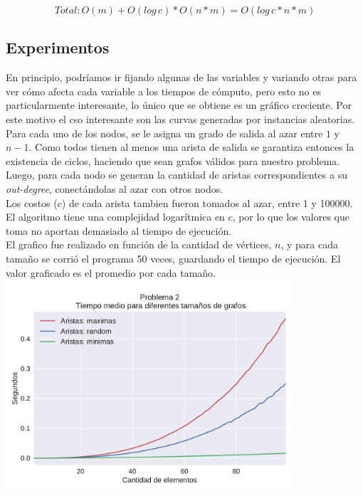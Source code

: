 $$Total:  O(m) + O(log \, c) * O(n*m) = O(log \, c *n*m) $$

\subsection{Experimentos}

En principio, podríamos ir fijando algunas de las variables y variando otras para ver cómo afecta cada variable a los tiempos de cómputo, pero esto no es particularmente interesante, lo único que se obtiene es un gráfico creciente. Por este motivo el cso interesante son las curvas generadas por instancias aleatorias.\\

Para cada uno de los nodos, se le asigna un grado de salida al azar entre $1$ y $n-1$. Como todos tienen al menos una arista de salida se garantiza entonces la existencia de ciclos, haciendo que sean grafos válidos para nuestro problema. Luego, para cada nodo se generan la cantidad de aristas correspondientes a su \textit{out-degree}, conectándolas al azar con otros nodos. \\

Los costos ($c$) de cada arista tambien fueron tomados al azar, entre 1 y 100000. El algoritmo tiene una complejidad logarítmica en $c$, por lo que los valores que toma no aportan demasiado al tiempo de ejecución. \\

El grafico fue realizado en función de la cantidad de vértices, $n$, y para cada tamaño se corrió el programa 50 veces,
guardando el tiempo de ejecución. El valor graficado es el promedio por cada tamaño. \\

{\centering
  \includegraphics[width=0.8\textwidth]{imagenes/problema2/n_aristas.pdf} \\
}

